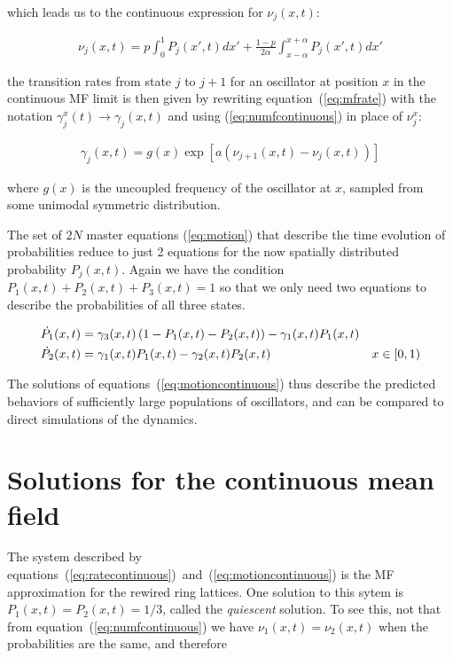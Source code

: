 \noindent which leads us to the continuous expression for $\nu_j(x,t)$:

\begin{align}
    \nu_j(x,t) = p \int_0^1 P_j(x',t)dx' + \frac{1-p}{2\alpha}\int_{x-\alpha}^{x+\alpha} P_j(x',t)dx'
    \label{eq:numfcontinuous}
\end{align}

\noindent the transition rates from state $j$ to $j+1$ for an oscillator at position $x$ in the continuous MF limit is then given by
rewriting equation~(\ref{eq:mfrate}) with the notation $\gamma^x_j(t) \to \gamma_j(x,t)$ and using (\ref{eq:numfcontinuous}) in place
of $\nu^x_j$:

\begin{align}
    \gamma_j(x,t) = g(x) \exp\left[ a\left( \nu_{j+1}(x,t) - \nu_j(x,t) \right) \right]
    \label{eq:ratecontinuous}
\end{align}

\noindent where $g(x)$ is the uncoupled frequency of the oscillator at $x$, sampled from some unimodal symmetric distribution.

The set of $2N$ master equations (\ref{eq:motion}) that describe the time evolution of probabilities reduce to just 2 equations for the
now spatially distributed probability $P_j(x,t)$. Again we have the condition $P_1(x,t) + P_2(x,t) + P_3(x,t)=1$ so that we only need
two equations to describe the probabilities of all three states.

\begin{align}
    \dot{P_1}(x,t) &= \gamma_3(x,t)\left(1-P_1(x,t)-P_2(x,t)\right) - \gamma_1(x,t)P_1(x,t) & \notag\\
    \dot{P_2}(x,t) &= \gamma_1(x,t)P_1(x,t) - \gamma_2(x,t)P_2(x,t) & x\in[0,1)
    \label{eq:motioncontinuous}
\end{align}

The solutions of equations~(\ref{eq:motioncontinuous}) thus describe the predicted behaviors of sufficiently large populations of
oscillators, and can be compared to direct simulations of the dynamics.

\section{Solutions for the continuous mean field}

The system described by equations~(\ref{eq:ratecontinuous})~and~(\ref{eq:motioncontinuous}) is the MF approximation for the rewired
ring lattices. One solution to this sytem is $P_1(x,t)=P_2(x,t)=1/3$, called the \textit{quiescent} solution. To see this, not that
from equation~(\ref{eq:numfcontinuous}) we have $\nu_1(x,t) = \nu_2(x,t)$ when the probabilities are the same, and therefore

